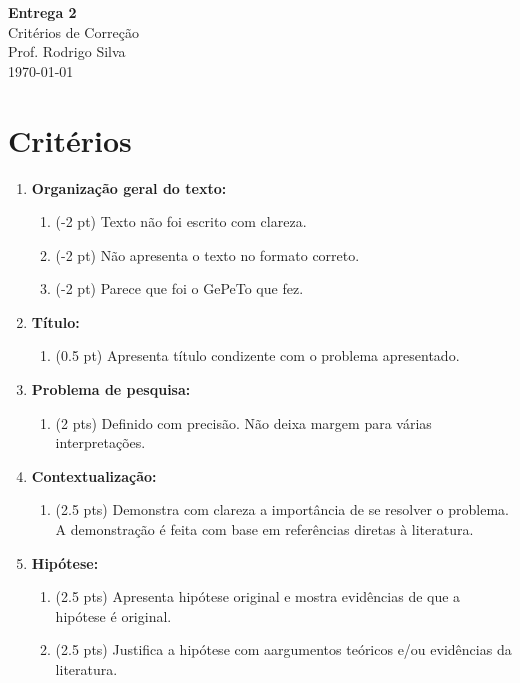 \documentclass[12pt,a4paper, brazil]{article}
\begin{document}
\begin{center}
{\textbf {\huge Entrega 2}}\\[5mm]
{\large Critérios de Correção } \\[2mm]
{\large Prof. Rodrigo Silva } \\[5mm]
\today\\[5mm] %
\end{center}



\section*{Critérios}

\begin{enumerate}
    \item \textbf{Organização geral do texto:}
        \begin{enumerate}
            \item (-2 pt) Texto não foi escrito com clareza. 
            \item (-2 pt) Não apresenta o texto no formato correto.
            \item (-2 pt) Parece que foi o GePeTo que fez.
        \end{enumerate}
    \item \textbf{Título:} 
    \begin{enumerate}
        \item (0.5 pt) Apresenta título condizente com o problema apresentado.
    \end{enumerate}
    \item \textbf{Problema de pesquisa:} 
        \begin{enumerate}
            \item (2 pts) Definido com precisão. Não deixa margem para várias interpretações.
        \end{enumerate}
    \item \textbf{Contextualização:} 
        \begin{enumerate}
            \item (2.5 pts) Demonstra com clareza a importância de se resolver o problema. A demonstração é feita com base em referências diretas à literatura. 
        \end{enumerate}
    \item \textbf{Hipótese:} 
        \begin{enumerate}
            \item (2.5 pts) Apresenta hipótese original e mostra evidências de que a hipótese é original.
            \item (2.5 pts) Justifica a hipótese com aargumentos teóricos e/ou evidências da literatura. 
        \end{enumerate}
\end{enumerate}
\end{document}
